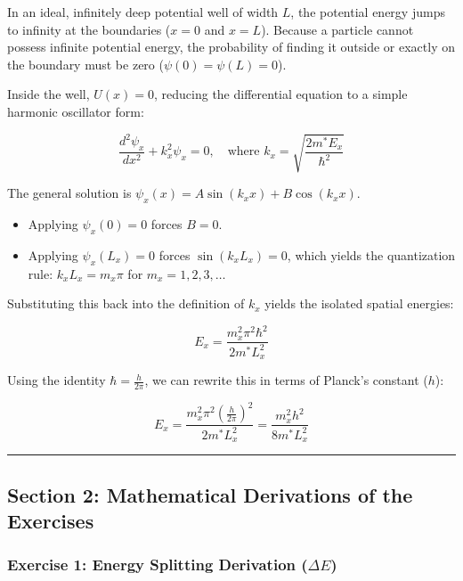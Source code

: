\documentclass[
]{article}
\providecommand{\tightlist}{%
  \setlength{\itemsep}{0pt}\setlength{\parskip}{0pt}}
\begin{document}
In an ideal, infinitely deep potential well of width \(L\), the
potential energy jumps to infinity at the boundaries (\(x=0\) and
\(x=L\)). Because a particle cannot possess infinite potential energy,
the probability of finding it outside or exactly on the boundary must be
zero (\(\psi(0) = \psi(L) = 0\)).

Inside the well, \(U(x) = 0\), reducing the differential equation to a
simple harmonic oscillator form:

\[\frac{d^2\psi_x}{dx^2} + k_x^2\psi_x = 0, \quad \text{where } k_x = \sqrt{\frac{2m^*E_x}{\hbar^2}}\]

The general solution is \(\psi_x(x) = A\sin(k_x x) + B\cos(k_x x)\).

\begin{itemize}
\tightlist
\item
  Applying \(\psi_x(0) = 0\) forces \(B = 0\).
\item
  Applying \(\psi_x(L_x) = 0\) forces \(\sin(k_x L_x) = 0\), which
  yields the quantization rule: \(k_x L_x = m_x\pi\) for
  \(m_x = 1, 2, 3, \dots\)
\end{itemize}

Substituting this back into the definition of \(k_x\) yields the
isolated spatial energies:

\[E_x = \frac{m_x^2 \pi^2 \hbar^2}{2m^* L_x^2}\]

Using the identity \(\hbar = \frac{h}{2\pi}\), we can rewrite this in
terms of Planck's constant (\(h\)):

\[E_x = \frac{m_x^2 \pi^2 \left(\frac{h}{2\pi}\right)^2}{2m^* L_x^2} = \frac{m_x^2 h^2}{8m^* L_x^2}\]

\begin{center}\rule{0.5\linewidth}{0.5pt}\end{center}

\subsection{Section 2: Mathematical Derivations of the
Exercises}\label{section-2-mathematical-derivations-of-the-exercises}

\subsubsection{\texorpdfstring{Exercise 1: Energy Splitting Derivation
(\(\Delta E\))}{Exercise 1: Energy Splitting Derivation (\textbackslash Delta E)}}\label{exercise-1-energy-splitting-derivation-delta-e}
\end{document}
